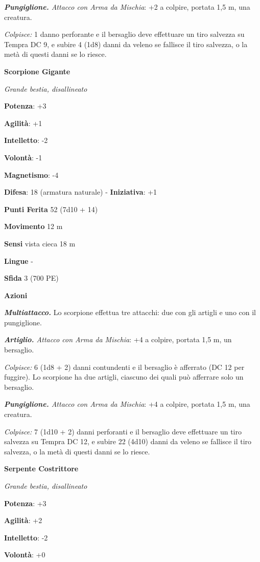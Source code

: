 \begin{multicols}{2}
\emph{\textbf{Pungiglione.} Attacco con Arma da Mischia}: +2 a colpire,
portata 1,5 m, una creatura.

\emph{Colpisce:} 1 danno perforante e il bersaglio deve effettuare un
tiro salvezza su Tempra DC 9, e subire 4 (1d8) danni da veleno se
fallisce il tiro salvezza, o la metà di questi danni se lo riesce.

\textbf{Scorpione Gigante}

\emph{Grande bestia, disallineato}

\textbf{Potenza}: +3

\textbf{Agilità}: +1

\textbf{Intelletto}: -2

\textbf{Volontà}: -1

\textbf{Magnetismo}: -4

\textbf{Difesa}: 18 (armatura naturale) - \textbf{Iniziativa}: +1

\textbf{Punti Ferita} 52 (7d10 + 14)

\textbf{Movimento} 12 m

\textbf{Sensi} vista cieca 18 m

\textbf{Lingue} -

\textbf{Sfida} 3 (700 PE)

\textbf{Azioni}

\emph{\textbf{Multiattacco.}} Lo scorpione effettua tre attacchi: due
con gli artigli e uno con il pungiglione.

\emph{\textbf{Artiglio.} Attacco con Arma da Mischia}: +4 a colpire,
portata 1,5 m, un bersaglio.

\emph{Colpisce:} 6 (1d8 + 2) danni contundenti e il bersaglio è
afferrato (DC 12 per fuggire). Lo scorpione ha due artigli, ciascuno dei
quali può afferrare solo un bersaglio.

\emph{\textbf{Pungiglione.} Attacco con Arma da Mischia}: +4 a colpire,
portata 1,5 m, una creatura.

\emph{Colpisce:} 7 (1d10 + 2) danni perforanti e il bersaglio deve
effettuare un tiro salvezza su Tempra DC 12, e subire 22 (4d10)
danni da veleno se fallisce il tiro salvezza, o la metà di questi danni
se lo riesce.

\textbf{Serpente Costrittore}

\emph{Grande bestia, disallineato}

\textbf{Potenza}: +3

\textbf{Agilità}: +2

\textbf{Intelletto}: -2

\textbf{Volontà}: +0


\end{multicols}
